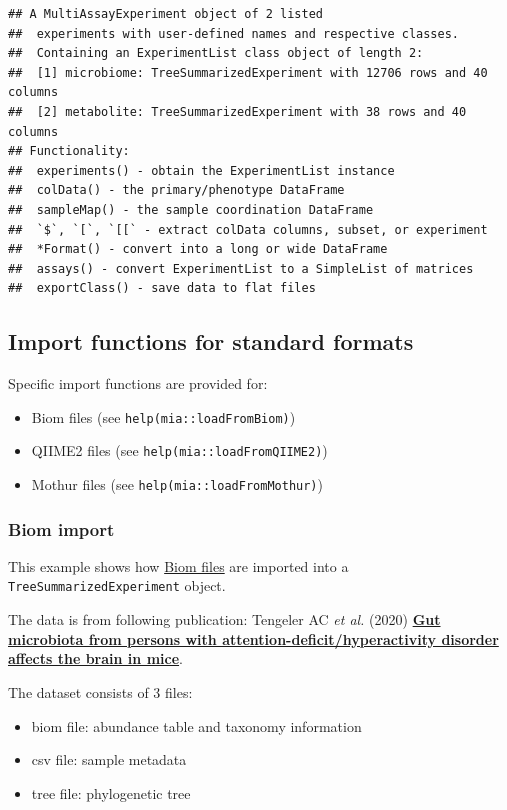 \documentclass[
]{book}
\providecommand{\tightlist}{%
  \setlength{\itemsep}{0pt}\setlength{\parskip}{0pt}}
\begin{document}
\begin{verbatim}
## A MultiAssayExperiment object of 2 listed
##  experiments with user-defined names and respective classes.
##  Containing an ExperimentList class object of length 2:
##  [1] microbiome: TreeSummarizedExperiment with 12706 rows and 40 columns
##  [2] metabolite: TreeSummarizedExperiment with 38 rows and 40 columns
## Functionality:
##  experiments() - obtain the ExperimentList instance
##  colData() - the primary/phenotype DataFrame
##  sampleMap() - the sample coordination DataFrame
##  `$`, `[`, `[[` - extract colData columns, subset, or experiment
##  *Format() - convert into a long or wide DataFrame
##  assays() - convert ExperimentList to a SimpleList of matrices
##  exportClass() - save data to flat files
\end{verbatim}

\hypertarget{import-functions-for-standard-formats}{%
\subsection{Import functions for standard formats}\label{import-functions-for-standard-formats}}

Specific import functions are provided for:

\begin{itemize}
\tightlist
\item
  Biom files (see \texttt{help(mia::loadFromBiom)})
\item
  QIIME2 files (see \texttt{help(mia::loadFromQIIME2)})
\item
  Mothur files (see \texttt{help(mia::loadFromMothur)})
\end{itemize}

\hypertarget{biom-import}{%
\subsubsection{Biom import}\label{biom-import}}

This example shows how \href{https://biom-format.org/}{Biom files} are imported into
a \texttt{TreeSummarizedExperiment} object.

The data is from following publication:
Tengeler AC \emph{et al.} (2020) \href{https://doi.org/10.1186/s40168-020-00816-x}{\textbf{Gut microbiota from persons with
attention-deficit/hyperactivity disorder affects the brain in
mice}}.

The dataset consists of 3 files:

\begin{itemize}
\tightlist
\item
  biom file: abundance table and taxonomy information
\item
  csv file: sample metadata
\item
  tree file: phylogenetic tree
\end{itemize}
\end{document}
